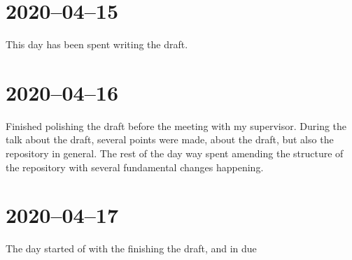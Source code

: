 \documentclass[12pt, letterpaper]{article}
\begin{document}
\section{2020--04--15}
This day has been spent writing the draft.

\section{2020--04--16}
Finished polishing the draft before the meeting with my supervisor. During the
talk about the draft, several points were made, about the draft, but also the
repository in general. The rest of the day way spent amending the structure of
the repository with several fundamental changes happening.

\section{2020--04--17}
The day started of with the finishing the draft, and in due
\end{document}
